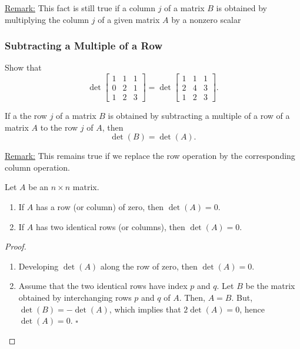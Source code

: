 \documentclass[20pt,a4paper]{extarticle}
\newcounter{example}
\newcounter{theorem}
\begin{document}
\underline{Remark:} This fact is still true if a column $j$ of a matrix $B$ is obtained by multiplying the column $j$ of a given matrix $A$ by a nonzero scalar

\newpage 

\subsubsection{Subtracting a Multiple of a Row}

\begin{example} 
Show that 
	\[
		\det \begin{bmatrix} 1 & 1 & 1 \\ 0 & 2 & 1 \\ 1 & 2 & 3 \end{bmatrix} = \det \begin{bmatrix} 1 & 1 & 1 \\ 2 & 4 & 3 \\ 1 & 2 & 3 \end{bmatrix} .
	\]
\end{example}

\begin{solution}

\end{solution}

\vfill 

\begin{theorem}
If a the row $j$ of a matrix $B$ is obtained by subtracting a multiple of a row of a matrix $A$ to the row $j$ of $A$, then
	\[
		\det (B) = \det (A) .
	\]
\end{theorem}

\underline{Remark:} This remains true if we replace the row operation by the corresponding column operation.

\newpage 

\begin{theorem}
Let $A$ be an $n \times n$ matrix.
	\begin{enumerate}
		\item If $A$ has a row (or column) of zero, then $\det (A) = 0$.
		\item If $A$ has two identical rows (or columns), then $\det (A) = 0$.
	\end{enumerate}
\end{theorem}

\begin{proof}
\begin{enumerate}
	\item Developing $\det (A)$ along the row of zero, then $\det (A) = 0$.
	\item Assume that the two identical rows have index $p$ and $q$. Let $B$ be the matrix obtained by interchanging rows $p$ and $q$ of $A$. Then, $A = B$. But, $\det (B) = - \det (A)$, which implies that $2 \det (A) = 0$, hence $\det (A) = 0$. \hfill $\square$
\end{enumerate}
\end{proof}
\end{document}
